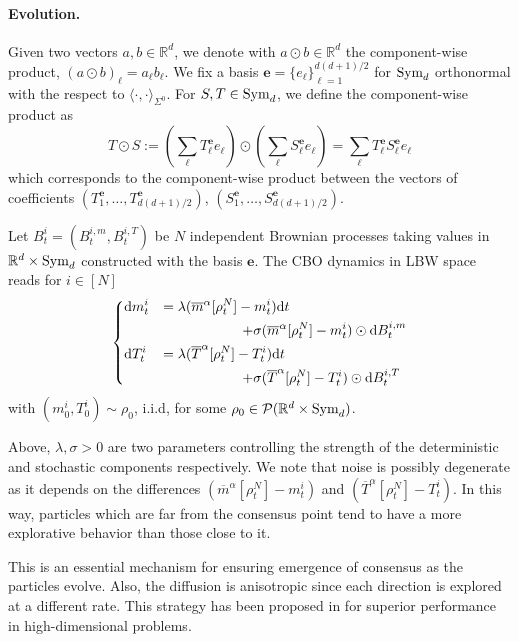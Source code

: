 \documentclass{article}
\theoremstyle{plain}
\theoremstyle{definition}
\theoremstyle{remark}
\newcommand{\Rd}{ {\mathbb{R}^d}}
\renewcommand{\d}{\mathrm{d}}
\newcommand{\sym}{\textup{Sym}_d}
\begin{document}
\paragraph{Evolution.}
Given two vectors $a,b\in \Rd$, we denote with $a\odot b \in \Rd$ the component-wise product, $(a\odot b)_{\ell} = a_\ell b_\ell$. We fix a basis $\bm{e} = \{e_\ell\}_{\ell = 1}^{d(d+1)/2}$ for $\sym$ orthonormal with the respect to $\langle \cdot, \cdot \rangle_{\Sigma^0}$. For $S,T\in \sym$, we define the component-wise product as
\[
T \odot S :=  \left(\sum_{\ell} T^{\bm{e}}_\ell e_\ell \right) \odot  \left(\sum_{\ell} S^{\bm{e}}_\ell e_\ell \right) = \sum_\ell T_{\ell}^{\bm{e}} S_{\ell}^{\bm{e}} e_\ell
\]
which corresponds to the component-wise product between the vectors of coefficients $(T_{1}^{\bm{e}},\dots, T^{\bm{e}}_{d(d+1)/2})$, $(S_{1}^{\bm{e}},\dots, S^{\bm{e}}_{d(d+1)/2})$. 

Let $B_t^i = (B^{i,m}_t, B_t^{i,T})$ be $N$ independent Brownian processes taking values in $\Rd \times \sym$ constructed with the basis $\bm{e}$. 
The CBO dynamics in LBW space reads for $i \in [N]$
\begin{equation} \label{eq:cboLBW}
\begin{dcases}
\d m^i_t  &= \lambda(\overline{m}^\alpha[\rho^N_t] - m^i_t)\d t \\
& \hspace{2cm} + \sigma (\overline{m}^\alpha[\rho^N_t] - m^i_t)\odot \d B_t^{i,m} \\
\d T^i_t &= \lambda(\overline{T}^\alpha[\rho^N_t] - T^i_t)\d t \\
& \hspace{2cm}  + \sigma(\overline{T}^\alpha[\rho^N_t] - T^i_t)\odot \d B_t^{i,T}
\end{dcases}
\end{equation}
with $(m_0^i, T_0^i)\sim \rho_0$, i.i.d, for some $\rho_0 \in \mathcal{P}(\Rd\times \sym)$.

Above, $\lambda, \sigma>0$ are two parameters controlling the strength of the deterministic and stochastic components respectively. We note that noise is possibly degenerate as it depends on the differences $(\overline{m}^\alpha[\rho^N_t] - m^i_t)$ and $(\overline{T}^\alpha[\rho^N_t] - T^i_t) $. In this way, particles which are far from the consensus point tend to have a more explorative behavior than those close to it. 

This is an essential mechanism for ensuring emergence of consensus as the particles evolve. Also, the diffusion is anisotropic since each direction is explored at a different rate. This strategy has been proposed in \cite{carrillo2021consensus} for superior performance in high-dimensional problems.
\end{document}
